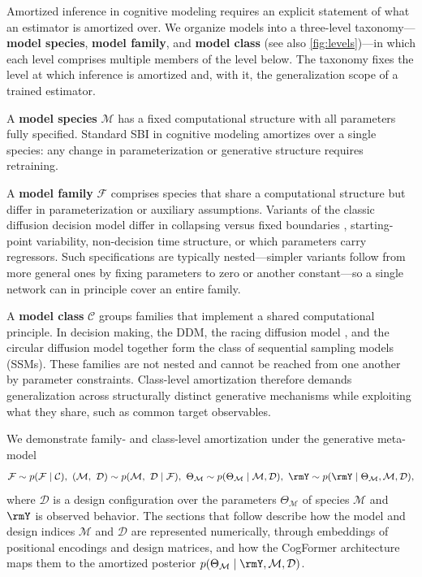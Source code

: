 Amortized inference in cognitive modeling requires an explicit statement of what an estimator is amortized over.
We organize models into a three-level taxonomy---\textbf{model species}, \textbf{model family}, and \textbf{model class} (see also \autoref{fig:levels})---in which each level comprises multiple members of the level below.
The taxonomy fixes the level at which inference is amortized and, with it, the generalization scope of a trained estimator.

A \textbf{model species} $\mathcal{M}$ has a fixed computational structure with all parameters fully specified.
Standard SBI in cognitive modeling amortizes over a single species: any change in parameterization or generative structure requires retraining.

A \textbf{model family} $\mathcal{F}$ comprises species that share a computational structure but differ in parameterization or auxiliary assumptions.
Variants of the classic diffusion decision model \citep[DDM;][]{ratcliff1978diffusionModel, ratcliffDiffusionModel2004} differ in collapsing versus fixed boundaries \citep{bogaczPhysicsOptimal2006, ditterichEvidenceTimevariant2006, rasanan2025collapsing}, starting-point variability, non-decision time structure, or which parameters carry regressors.
Such specifications are typically nested---simpler variants follow from more general ones by fixing parameters to zero or another constant---so a single network can in principle cover an entire family.

A \textbf{model class} $\mathcal{C}$ groups families that implement a shared computational principle.
In decision making, the DDM, the racing diffusion model \citep[RDM;][]{tillman2020racingDiffusion, zandbeltResponseTimes2014}, and the circular diffusion model \citep[CDM;][]{smith2016circularDiffusion, rasananDiscretechoiceOptions2024} together form the class of sequential sampling models (SSMs).
These families are not nested and cannot be reached from one another by parameter constraints.
Class-level amortization therefore demands generalization across structurally distinct generative mechanisms while exploiting what they share, such as common target observables.

We demonstrate family- and class-level amortization under the generative meta-model
%
\begin{equation}\label{eq:generative}
\mathcal{F} \sim p(\mathcal{F} \mid \mathcal{C}), \,\,
(\mathcal{M},\,\,\mathcal{D}) \sim p(\mathcal{M},\,\, \mathcal{D} \mid \mathcal{F}), \,\,
\Theta_\mathcal{M} \sim p(\Theta_\mathcal{M} \mid \mathcal{M}, \mathcal{D}), \,\,
\rmY \sim p(\rmY \mid \Theta_\mathcal{M},\mathcal{M}, \mathcal{D}),
\end{equation}
%
\noindent where $\mathcal{D}$ is a design configuration over the parameters $\Theta_\mathcal{M}$ of species $\mathcal{M}$ and $\rmY$ is observed behavior.
The sections that follow describe how the model and design indices $\mathcal{M}$ and $\mathcal{D}$ are represented numerically, through embeddings of positional encodings and design matrices, and how the CogFormer architecture maps them to the amortized posterior $p(\Theta_{\mathcal{M}} \mid \rmY, \mathcal{M}, \mathcal{D})$.

